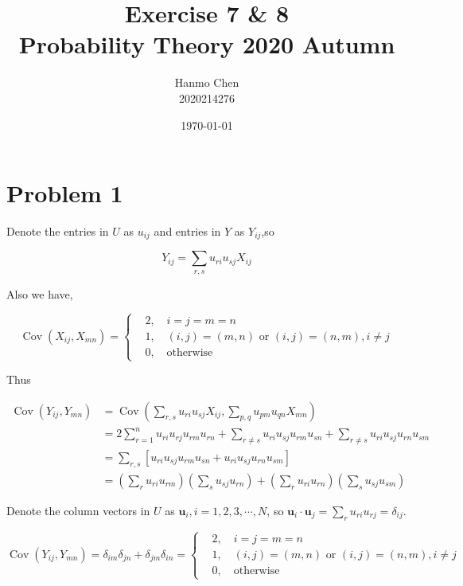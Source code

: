 \documentclass{article}
\title{Exercise 7 \& 8 \\ Probability Theory 2020 Autumn}
\author{Hanmo Chen \\ 2020214276}
\date{\today}
\DeclareMathOperator{\Cov}{\operatorname{Cov}}
\newcommand{\vu}{\boldsymbol{u}}
\begin{document}
\maketitle

\section{Problem 1}

Denote the entries in $U$ as $u_{ij}$ and entries in $Y$ as $Y_{ij}$,so 

\begin{equation}
    Y_{ij} = \sum_{r,s} u_{ri} u_{sj} X_{ij} 
\end{equation}

Also we have,

\begin{equation}
    \Cov(X_{ij},X_{mn}) = \left\{\begin{aligned}
        &2,\quad i=j=m=n \\
        &1,\quad (i,j) = (m,n) \text{ or } (i,j) = (n,m), i \neq j \\
        &0,\quad \text{otherwise}
    \end{aligned}\right.
\end{equation}

Thus

\begin{equation}
    \begin{aligned}
        \Cov(Y_{ij},Y_{mn}) & = \Cov\left(\sum_{r,s} u_{ri} u_{sj} X_{ij}, \sum_{p,q} u_{pm} u_{qn} X_{mn} \right) \\
        & = 2\sum_{r=1}^n u_{ri}u_{rj} u_{rm}u_{rn} + \sum_{r\neq s} u_{ri} u_{sj} u_{rm} u_{sn} + \sum_{r\neq s} u_{ri} u_{sj} u_{rn} u_{sm} \\
        & = \sum_{r,s}\left[u_{ri} u_{sj} u_{rm} u_{sn}+u_{ri} u_{sj} u_{rn} u_{sm} \right] \\
        & = \left(\sum_{r} u_{ri} u_{rm} \right) \left(\sum_{s} u_{sj} u_{rn} \right) + \left(\sum_{r} u_{ri} u_{rn} \right) \left(\sum_{s} u_{sj} u_{sm} \right) 
    \end{aligned}
\end{equation}

Denote the column vectors in $U$ as $\vu_i,i=1,2,3,\cdots,N$, so $\vu_i\cdot \vu_j = \sum_{r} u_{ri} u_{rj} = \delta_{ij}$. 

\begin{equation}
    \Cov(Y_{ij},Y_{mn}) = \delta_{im} \delta_{jn} +  \delta_{jm} \delta_{in} = \left\{ \begin{aligned}
        &2,\quad i=j=m=n \\
        &1,\quad (i,j) = (m,n) \text{ or } (i,j) = (n,m), i \neq j \\
        &0,\quad \text{otherwise}
    \end{aligned}\right.
\end{equation}
\end{document}
